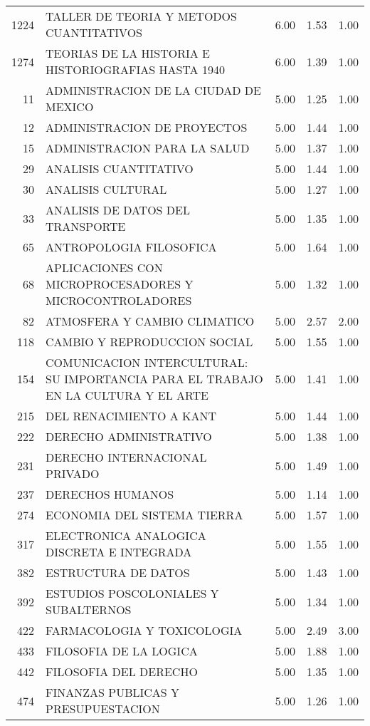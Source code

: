 \documentclass[12pt]{article}
\begin{document}
\begin{table}[ht]
\begin{tabular}{rlrrr}
  1224 & TALLER DE TEORIA Y METODOS CUANTITATIVOS & 6.00 & 1.53 & 1.00 \\ 
  1274 & TEORIAS DE LA HISTORIA E HISTORIOGRAFIAS HASTA 1940 & 6.00 & 1.39 & 1.00 \\ 
  11 & ADMINISTRACION DE LA CIUDAD DE MEXICO & 5.00 & 1.25 & 1.00 \\ 
  12 & ADMINISTRACION DE PROYECTOS & 5.00 & 1.44 & 1.00 \\ 
  15 & ADMINISTRACION PARA LA SALUD & 5.00 & 1.37 & 1.00 \\ 
  29 & ANALISIS CUANTITATIVO & 5.00 & 1.44 & 1.00 \\ 
  30 & ANALISIS CULTURAL & 5.00 & 1.27 & 1.00 \\ 
  33 & ANALISIS DE DATOS DEL TRANSPORTE & 5.00 & 1.35 & 1.00 \\ 
  65 & ANTROPOLOGIA FILOSOFICA & 5.00 & 1.64 & 1.00 \\ 
  68 & APLICACIONES CON MICROPROCESADORES Y MICROCONTROLADORES & 5.00 & 1.32 & 1.00 \\ 
  82 & ATMOSFERA Y CAMBIO CLIMATICO & 5.00 & 2.57 & 2.00 \\ 
  118 & CAMBIO Y REPRODUCCION SOCIAL & 5.00 & 1.55 & 1.00 \\ 
  154 & COMUNICACION INTERCULTURAL: SU IMPORTANCIA PARA EL TRABAJO EN LA CULTURA Y EL ARTE & 5.00 & 1.41 & 1.00 \\ 
  215 & DEL RENACIMIENTO A KANT & 5.00 & 1.44 & 1.00 \\ 
  222 & DERECHO ADMINISTRATIVO & 5.00 & 1.38 & 1.00 \\ 
  231 & DERECHO INTERNACIONAL PRIVADO & 5.00 & 1.49 & 1.00 \\ 
  237 & DERECHOS HUMANOS & 5.00 & 1.14 & 1.00 \\ 
  274 & ECONOMIA DEL SISTEMA TIERRA & 5.00 & 1.57 & 1.00 \\ 
  317 & ELECTRONICA ANALOGICA DISCRETA E INTEGRADA & 5.00 & 1.55 & 1.00 \\ 
  382 & ESTRUCTURA DE DATOS & 5.00 & 1.43 & 1.00 \\ 
  392 & ESTUDIOS POSCOLONIALES Y SUBALTERNOS & 5.00 & 1.34 & 1.00 \\ 
  422 & FARMACOLOGIA Y TOXICOLOGIA & 5.00 & 2.49 & 3.00 \\ 
  433 & FILOSOFIA DE LA LOGICA & 5.00 & 1.88 & 1.00 \\ 
  442 & FILOSOFIA DEL DERECHO & 5.00 & 1.35 & 1.00 \\ 
  474 & FINANZAS PUBLICAS Y PRESUPUESTACION & 5.00 & 1.26 & 1.00 \\ 

\end{tabular}
\end{table}
\end{document}
